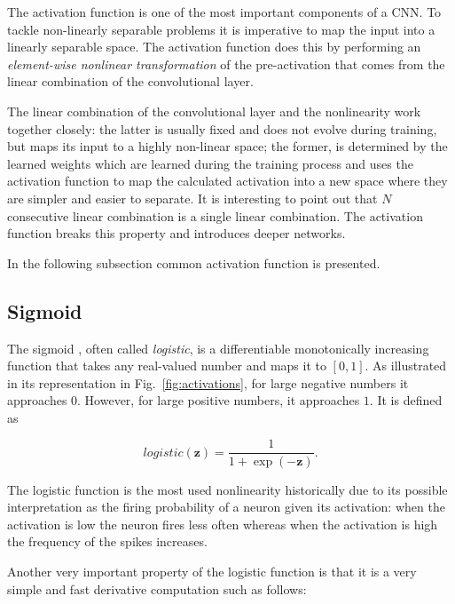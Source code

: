 The activation function \cite{sharma2017activation} is one of the most important components of a CNN. To tackle non-linearly separable problems it is imperative to map the input into a linearly separable space. The activation function does this by performing an \emph{element-wise nonlinear transformation} of the pre-activation that comes from the linear combination of the convolutional layer.

The linear combination of the convolutional layer and the nonlinearity work together closely: the latter is usually fixed and does not evolve during training, but maps its input to a highly non-linear space; the former, is determined by the learned weights which are learned during the training process and uses the activation function to map the calculated activation into a new space where they are simpler and easier to separate. It is interesting to point out that $N$ consecutive linear combination is a single linear combination. The activation function breaks this property and introduces deeper networks.

In the following subsection common activation function is presented.

\subsection{Sigmoid}\label{sec:logistic}
The sigmoid \cite{lecun1989handwritten}, often called \emph{logistic}, is a differentiable monotonically
increasing function that takes any real-valued number and maps it to $[0, 1]$.
As illustrated in its representation in Fig.~\ref{fig:activations}, for large
negative numbers it approaches $0$. However, for large positive numbers, it
approaches $1$. It is defined~\cite{lecun1989handwritten} as

\begin{equation}\label{eq:logistic}
    logistic(\mathbf{z}) = \frac{1}{1+\exp(-\mathbf{z})}.
\end{equation}

\noindent The logistic function is the most used nonlinearity historically due to its possible interpretation as the firing probability of a neuron given its activation: when the activation is low the neuron fires less often whereas when the activation is high the frequency of the spikes increases.

Another very important property of the logistic function is that it is a very
simple and fast derivative computation such as follows:

